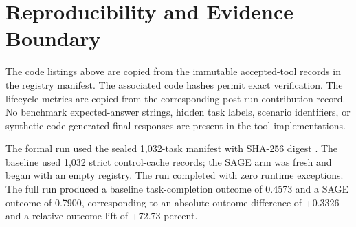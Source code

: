 \section{Reproducibility and Evidence
Boundary}\label{reproducibility-and-evidence-boundary}

The code listings above are copied from the immutable accepted-tool
records in the registry manifest. The associated code hashes permit
exact verification. The lifecycle metrics are copied from the
corresponding post-run contribution record. No benchmark expected-answer
strings, hidden task labels, scenario identifiers, or synthetic
code-generated final responses are present in the tool implementations.

The formal run used the sealed 1,032-task manifest with SHA-256 digest
.
The baseline used 1,032 strict control-cache records; the SAGE arm was
fresh and began with an empty registry. The run completed with zero
runtime exceptions. The full run produced a baseline task-completion
outcome of 0.4573 and a SAGE outcome of 0.7900, corresponding to an
absolute outcome difference of +0.3326 and a relative outcome lift of
+72.73 percent.
